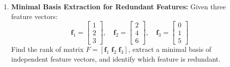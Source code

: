 \begin{enumerate}
\item \textbf{Minimal Basis Extraction for Redundant Features:} Given three feature vectors:
\begin{equation*}
\mathbf{f}_1 = \begin{bmatrix} 1 \\ 2 \\ 3 \end{bmatrix}, \quad \mathbf{f}_2 = \begin{bmatrix} 2 \\ 4 \\ 6 \end{bmatrix}, \quad \mathbf{f}_3 = \begin{bmatrix} 0 \\ 1 \\ 5 \end{bmatrix}
\end{equation*}
Find the rank of matrix $F = [\mathbf{f}_1 \; \mathbf{f}_2 \; \mathbf{f}_3]$, extract a minimal basis of independent feature vectors, and identify which feature is redundant.
\end{enumerate}

